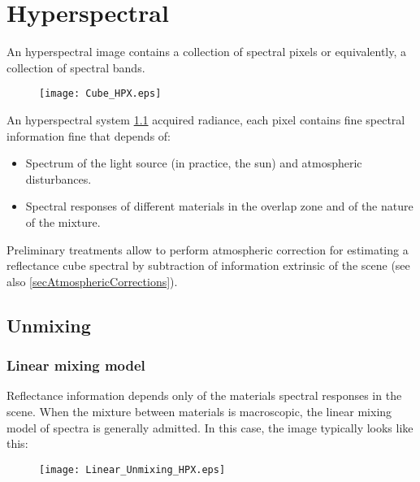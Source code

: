 \chapter{Hyperspectral}

An hyperspectral image contains a collection of spectral pixels or
equivalently, a collection of spectral bands.

\begin{figure}[h]
  \centering
  \texttt{[image: Cube\_HPX.eps]}
  \label{fig:cube}
\end{figure}

An hyperspectral system \ref{fig:cube} acquired
radiance, each pixel contains fine spectral information
fine that depends of:

\begin{itemize}
\item{Spectrum of the light source (in practice, the
sun) and atmospheric disturbances.}
\item{Spectral responses
of different materials in the overlap zone and of the nature of the mixture.}
\end{itemize}

Preliminary treatments allow to perform 
atmospheric correction for estimating a reflectance cube
spectral by subtraction of information extrinsic of the
scene (see also \ref{secAtmosphericCorrections}).
 
\section{Unmixing}

\subsection{Linear mixing model}

Reflectance information depends only of the materials spectral responses in the scene. When the mixture between
materials is macroscopic, the linear mixing model of spectra
is generally admitted. In this case, the image typically looks like this:

\begin{figure}[h]
  \centering
  \texttt{[image: Linear\_Unmixing\_HPX.eps]}
  \label{fig:linear_unmixing}
\end{figure}

